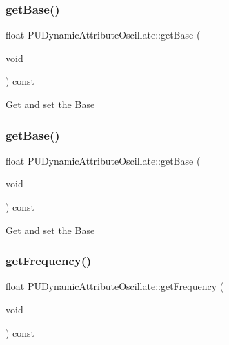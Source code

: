 \subsubsection{\texorpdfstring{get\+Base()}{getBase()}\hspace{0.1cm}{\footnotesize\ttfamily [1/2]}}
{\footnotesize\ttfamily float P\+U\+Dynamic\+Attribute\+Oscillate\+::get\+Base (\begin{DoxyParamCaption}\item[{void}]{ }\end{DoxyParamCaption}) const}

Get and set the Base \mbox{\label{classPUDynamicAttributeOscillate_adc434b9e002bf31436f522291de78b99}} 
\subsubsection{\texorpdfstring{get\+Base()}{getBase()}\hspace{0.1cm}{\footnotesize\ttfamily [2/2]}}
{\footnotesize\ttfamily float P\+U\+Dynamic\+Attribute\+Oscillate\+::get\+Base (\begin{DoxyParamCaption}\item[{void}]{ }\end{DoxyParamCaption}) const}

Get and set the Base \mbox{\label{classPUDynamicAttributeOscillate_af8a1b226426bf7f180b62cb823af1594}} 
\subsubsection{\texorpdfstring{get\+Frequency()}{getFrequency()}\hspace{0.1cm}{\footnotesize\ttfamily [1/2]}}
{\footnotesize\ttfamily float P\+U\+Dynamic\+Attribute\+Oscillate\+::get\+Frequency (\begin{DoxyParamCaption}\item[{void}]{ }\end{DoxyParamCaption}) const}

